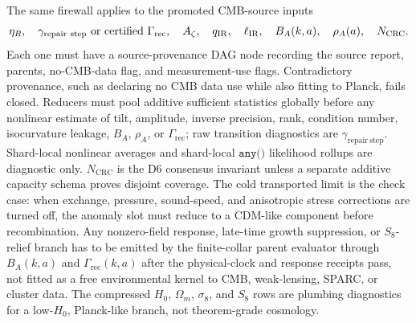 The same firewall applies to the promoted CMB-source inputs
\[
  \eta_R,\quad \gamma_{\mathrm{repair\ step}}\hbox{ or certified }\Gamma_{\mathrm{rec}},
  \quad A_\zeta,\quad q_{\mathrm{IR}},
  \quad \ell_{\mathrm{IR}},\quad B_A(k,a),\quad \rho_A(a),\quad N_{\mathrm{CRC}} .
\]
Each one must have a source-provenance DAG node recording the source report,
parents, no-CMB-data flag, and measurement-use flags.
Contradictory provenance, such as declaring no CMB data use while also fitting
to Planck, fails closed.  Reducers must pool additive sufficient statistics
globally before any nonlinear estimate of tilt, amplitude, inverse precision,
rank, condition number, isocurvature leakage, \(B_A\), \(\rho_A\), or
\(\Gamma_{\mathrm{rec}}\); raw transition diagnostics are
\(\gamma_{\mathrm{repair\ step}}\). Shard-local nonlinear averages and shard-local
\(\texttt{any()}\) likelihood rollups are diagnostic only.  \(N_{\mathrm{CRC}}\)
is the D6 consensus invariant unless a separate additive capacity schema
proves disjoint coverage.
The cold transported limit is the check case: when exchange, pressure, sound-speed, and anisotropic
stress corrections are turned off, the anomaly slot must reduce to a CDM-like component before
recombination. Any nonzero-field response, late-time growth suppression, or \(S_8\)-relief branch
has to be emitted by the finite-collar parent evaluator through \(B_A(k,a)\) and
\(\Gamma_{\mathrm{rec}}(k,a)\) after the physical-clock and response receipts pass, not fitted as a free environmental kernel to CMB, weak-lensing,
SPARC, or cluster data. The compressed \(H_0\), \(\Omega_m\), \(\sigma_8\), and \(S_8\) rows are
plumbing diagnostics for a low-\(H_0\), Planck-like branch, not theorem-grade cosmology.

